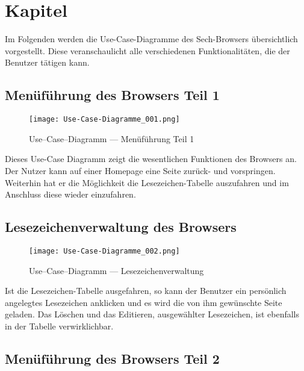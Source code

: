 
\chapter{Kapitel}

Im Folgenden werden die Use-Case-Diagramme des Sech-Browsers übersichtlich vorgestellt. Diese veranschaulicht alle verschiedenen Funktionalitäten, die der Benutzer tätigen kann.

\section{Menüführung des Browsers Teil 1}

\begin{figure}[htb]
\texttt{[image: Use-Case-Diagramme\_001.png]}
	\caption{Use--Case--Diagramm --- Menüführung Teil 1}
	\label{fig:Menüführung Teil 1}
\end{figure}
	
Dieses Use-Case Diagramm zeigt die wesentlichen Funktionen des Browsers an. Der Nutzer kann auf einer Homepage eine Seite zurück- und vorspringen. Weiterhin hat er die Möglichkeit die Lesezeichen-Tabelle auszufahren und im Anschluss diese wieder einzufahren.

\section{Lesezeichenverwaltung des Browsers}

\begin{figure}[htb]
\texttt{[image: Use-Case-Diagramme\_002.png]}
	\caption{Use--Case--Diagramm --- Lesezeichenverwaltung}
	\label{fig:Lesezeichenverwaltung}
\end{figure}

Ist die Lesezeichen-Tabelle ausgefahren, so kann der Benutzer ein persönlich angelegtes Lesezeichen anklicken und es wird die von ihm gewünschte Seite geladen. Das Löschen und das Editieren, ausgewählter Lesezeichen, ist ebenfalls in der Tabelle verwirklichbar.

\section{Menüführung des Browsers Teil 2}

